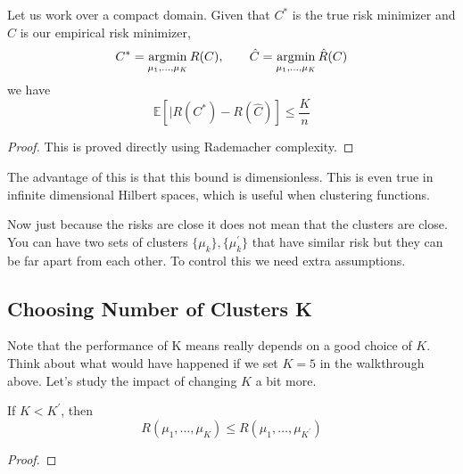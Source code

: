   \begin{theorem}
    Let us work over a compact domain. Given that $C^\ast$ is the true risk minimizer and $\hat{C}$ is our empirical risk minimizer, 
    \begin{equation}
      C^\ast = \argmin_{\mu_1, \ldots, \mu_K} R(C), \qquad \hat{C} = \argmin_{\mu_1, \ldots, \mu_K} \hat{R}(C) 
    \end{equation}
    we have 
    \begin{equation}
      \mathbb{E} \left[ | R(C^\ast) - R(\hat{C}) \right] \leq \frac{K}{n}
    \end{equation}
  \end{theorem}
  \begin{proof}
    This is proved directly using Rademacher complexity. 
  \end{proof}

  The advantage of this is that this bound is dimensionless. This is even true in infinite dimensional Hilbert spaces, which is useful when clustering functions. 

  Now just because the risks are close it does not mean that the clusters are close. You can have two sets of clusters $\{\mu_k\}, \{\mu_k^\prime\}$ that have similar risk but they can be far apart from each other. To control this we need extra assumptions. 

\subsection{Choosing Number of Clusters K}

  Note that the performance of K means really depends on a good choice of $K$. Think about what would have happened if we set $K = 5$ in the walkthrough above. Let's study the impact of changing $K$ a bit more. 

  \begin{theorem}
    If $K < K^\prime$, then 
    \begin{equation}
      R(\mu_1, \ldots, \mu_K) \leq R(\mu_1, \ldots, \mu_{K^\prime})
    \end{equation}
  \end{theorem}
  \begin{proof}
    
  \end{proof}



